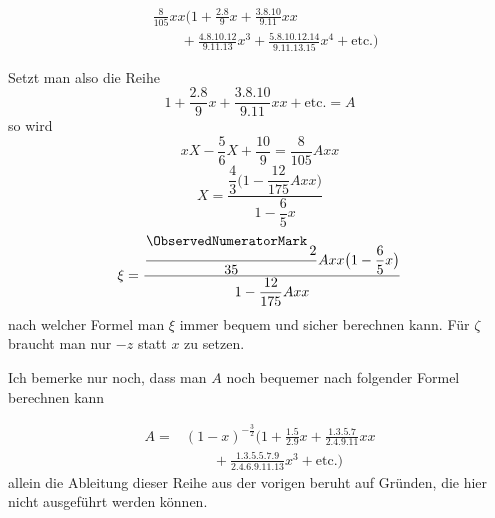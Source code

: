 \[
\begin{aligned}
&\frac{8}{105}xx\bigl(1+\frac{2\mathord{.}8}{9}x+\frac{3\mathord{.}8\mathord{.}10}{9\mathord{.}11}xx\\
&\qquad+\frac{4\mathord{.}8\mathord{.}10\mathord{.}12}{9\mathord{.}11\mathord{.}13}x^3+\frac{5\mathord{.}8\mathord{.}10\mathord{.}12\mathord{.}14}{9\mathord{.}11\mathord{.}13\mathord{.}15}x^4+\text{etc.}\bigr)
\end{aligned}
\]
\par\indent Setzt man also die Reihe
\[
1+\frac{2\mathord{.}8}{9}x+\frac{3\mathord{.}8\mathord{.}10}{9\mathord{.}11}xx+\text{etc.}=A
\]
\noindent so wird
\[
xX-\frac{5}{6}X+\frac{10}{9}=\frac{8}{105}Axx
\]
\[
X=\frac{\dfrac{4}{3}\bigl(1-\dfrac{12}{175}Axx\bigr)}{1-\dfrac{6}{5}x}
\]
\[
\xi=\frac{\dfrac{\mathord{\raisebox{7bp}{\ObservedNumeratorMark}\,}2}{35}Axx\bigl(1-\dfrac{6}{5}x\bigr)}{1-\dfrac{12}{175}Axx}
\]
\noindent nach welcher Formel man $\xi$ immer bequem und sicher berechnen kann. Für $\zeta$ braucht man nur $-z$ statt $x$ zu setzen.

\par\indent Ich bemerke nur noch, dass man $A$ noch bequemer nach folgender Formel berechnen kann

\[
\begin{aligned}
A={}&(1-x)^{-\frac{3}{2}}\bigl(1+\frac{1\mathord{.}5}{2\mathord{.}9}x+\frac{1\mathord{.}3\mathord{.}5\mathord{.}7}{2\mathord{.}4\mathord{.}9\mathord{.}11}xx\\
&\qquad+\frac{1\mathord{.}3\mathord{.}5\mathord{.}5\mathord{.}7\mathord{.}9}{2\mathord{.}4\mathord{.}6\mathord{.}9\mathord{.}11\mathord{.}13}x^3+\text{etc.}\bigr)
\end{aligned}
\]
\noindent allein die Ableitung dieser Reihe aus der vorigen beruht auf Gründen, die hier nicht ausgeführt werden können.
